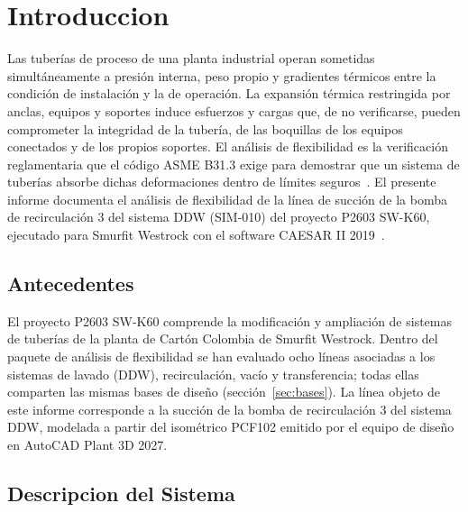 \section{Introduccion}
\label{sec:intro}

Las tuber\'{i}as de proceso de una planta industrial operan sometidas
simult\'{a}neamente a presi\'{o}n interna, peso propio y gradientes t\'{e}rmicos
entre la condici\'{o}n de instalaci\'{o}n y la de operaci\'{o}n. La expansi\'{o}n
t\'{e}rmica restringida por anclas, equipos y soportes induce esfuerzos y cargas
que, de no verificarse, pueden comprometer la integridad de la tuber\'{i}a, de las
boquillas de los equipos conectados y de los propios soportes. El an\'{a}lisis de
flexibilidad es la verificaci\'{o}n reglamentaria que el c\'{o}digo ASME B31.3
exige para demostrar que un sistema de tuber\'{i}as absorbe dichas deformaciones
dentro de l\'{i}mites seguros~\cite{asme_b313_2016}. El presente informe documenta
el an\'{a}lisis de flexibilidad de la l\'{i}nea de succi\'{o}n de la bomba de
recirculaci\'{o}n 3 del sistema DDW (SIM-010) del proyecto P2603 SW-K60,
ejecutado para Smurfit Westrock con el software CAESAR II
2019~\cite{caesar2_ug_2019}.

\subsection{Antecedentes}

El proyecto P2603 SW-K60 comprende la modificaci\'{o}n y ampliaci\'{o}n de
sistemas de tuber\'{i}as de la planta de Cart\'{o}n Colombia de Smurfit Westrock.
Dentro del paquete de an\'{a}lisis de flexibilidad se han evaluado ocho
l\'{i}neas asociadas a los sistemas de lavado (DDW), recirculaci\'{o}n, vac\'{i}o
y transferencia; todas ellas comparten las mismas bases de dise\~{n}o
(secci\'{o}n~\ref{sec:bases}). La l\'{i}nea objeto de este informe corresponde a
la succi\'{o}n de la bomba de recirculaci\'{o}n 3 del sistema DDW, modelada a
partir del isom\'{e}trico PCF102 emitido por el equipo de dise\~{n}o en AutoCAD
Plant 3D 2027.

\subsection{Descripcion del Sistema}

